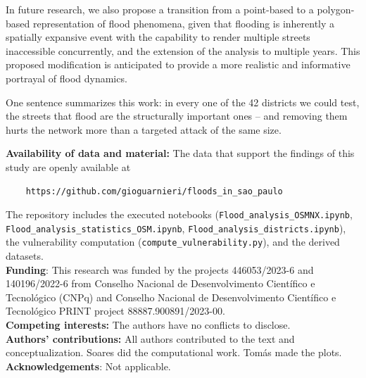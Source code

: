 \documentclass[sn-nature]{sn-jnl}%
\theoremstyle{thmstyleone}%
\theoremstyle{thmstyletwo}%
\theoremstyle{thmstylethree}%
\begin{document}
In future research, we also propose a transition from a point-based to a polygon-based representation of flood phenomena, given that flooding is inherently a spatially expansive event with the capability to render multiple streets inaccessible concurrently, and the extension of the analysis to multiple years. This proposed modification is anticipated to provide a more realistic and informative portrayal of flood dynamics.

One sentence summarizes this work: in every one of the 42 districts we could test, the streets that flood are the structurally important ones -- and removing them hurts the network more than a targeted attack of the same size.
\\

\newpage
\thispagestyle{empty}

\noindent \textbf{Availability of data and material:} The data that support the findings of this study are openly available at
\begin{verbatim}
    https://github.com/gioguarnieri/floods_in_sao_paulo
\end{verbatim}
The repository includes the executed notebooks (\texttt{Flood\_analysis\_OSMNX.ipynb}, \texttt{Flood\_analysis\_statistics\_OSM.ipynb}, \texttt{Flood\_analysis\_districts.ipynb}), the vulnerability computation (\texttt{compute\_vulnerability.py}), and the derived datasets.\\
\noindent \textbf{Funding}: This research was funded by the projects 446053/2023-6 and 140196/2022-6 from Conselho Nacional de Desenvolvimento Científico e Tecnológico (CNPq) and Conselho Nacional de Desenvolvimento Científico e Tecnológico PRINT project 88887.900891/2023-00.\\
\noindent \textbf{Competing interests:} The authors have no conflicts to disclose.\\
\noindent \textbf{Authors' contributions:} All authors contributed to the text and conceptualization. Soares did the computational work. Tomás made the plots.\\
\noindent \textbf{Acknowledgements}: Not applicable.




\end{document}
